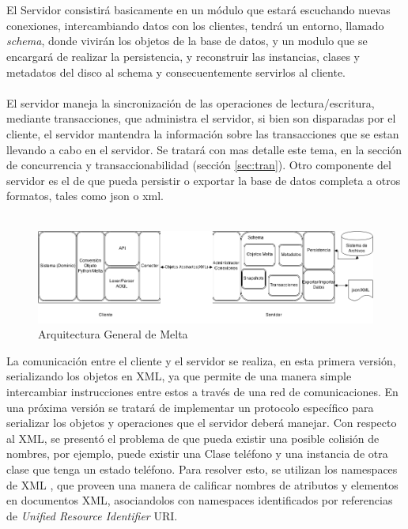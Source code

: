 \documentclass{melta}
\begin{document}
\\\\
El Servidor consistirá basicamente en un módulo que estará escuchando nuevas conexiones, intercambiando datos con los clientes, tendrá un entorno, llamado \textit{schema}, donde vivirán los objetos de la base de datos, y un modulo que se encargará de realizar la persistencia, y reconstruir las instancias, clases y metadatos del disco al schema y consecuentemente servirlos al cliente.  
\\\\
El servidor maneja la sincronización de las operaciones de lectura/escritura, mediante transacciones, que administra el servidor, si bien son disparadas por el cliente, el servidor mantendra la información sobre las transacciones que se estan llevando a cabo en el servidor. Se tratará con mas detalle este tema, en la sección de concurrencia y transaccionabilidad (sección \ref{sec:tran}).
Otro componente del servidor es el de que pueda persistir o exportar la base de datos completa a otros formatos, tales como json o xml.
\\\\
\begin{figure}
\centering
\includegraphics[width=19cm]{MeltaArchitecture}
\caption{Arquitectura General de Melta}
\label{fig:flies}
\end{figure}

La comunicación entre el cliente y el servidor se realiza, en esta primera versión, serializando los objetos en XML, ya que permite de una manera simple intercambiar instrucciones entre estos a través de una red de comunicaciones. En una próxima versión se tratará de implementar un protocolo específico para serializar los objetos y operaciones que el servidor deberá manejar. Con respecto al XML, se presentó el problema de que pueda existir una posible colisión de nombres, por ejemplo, puede existir una Clase teléfono y una instancia de otra clase que tenga un estado teléfono. Para resolver esto, se utilizan los namespaces de XML \cite{xml:BHL06}, que proveen una manera de calificar nombres de atributos y elementos en documentos XML, asociandolos con namespaces identificados por referencias de \textit{Unified Resource Identifier} URI.
\end{document}
